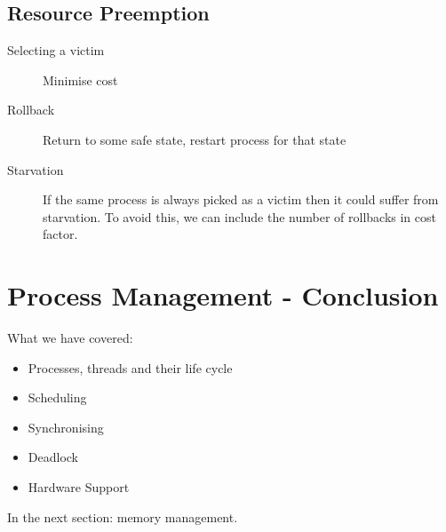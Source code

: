 \documentclass[11pt]{article}
\begin{document}
\subsection{Resource Preemption}
\label{sec:orgee2757c}
\begin{description}
\item[{Selecting a victim}] Minimise cost
\item[{Rollback}] Return to some safe state, restart process for that state
\item[{Starvation}] If the same process is always picked as a victim then it could suffer from starvation. To avoid this, we can include the number of rollbacks in cost factor.
\end{description}



\section{Process Management - Conclusion}
\label{sec:org8fdf03f}
What we have covered:
\begin{itemize}
\item Processes, threads and their life cycle
\item Scheduling
\item Synchronising
\item Deadlock
\item Hardware Support
\end{itemize}
In the next section: memory management.
\end{document}
